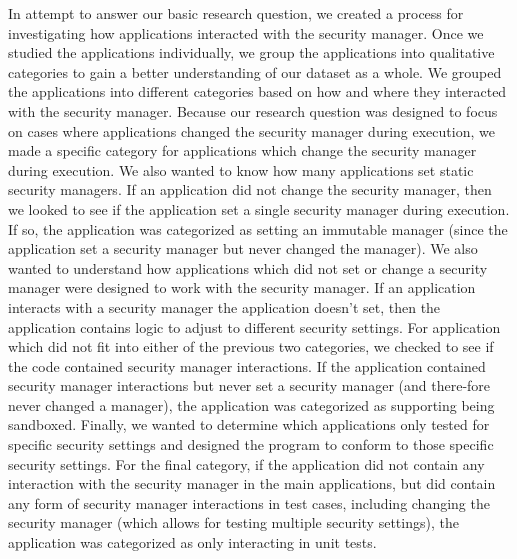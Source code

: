 \documentclass{sig-alternate}
\begin{document}
In attempt to answer our basic research question, we created a process 
for investigating how applications interacted with the security manager.  
Once we studied the applications individually, we group the applications
into qualitative categories to gain a better understanding of our dataset
as a whole.  We grouped the applications into 
different categories based on how and where they interacted with the security 
manager. Because our research question was designed to focus on cases 
where applications changed the security manager during execution, we made a 
specific category for applications which change the security manager during
execution.  We also wanted to know how many applications set static 
security managers. If an application did not change the security manager, 
then we looked to see if the application set a single security manager 
during execution.  If so, the
application was categorized as setting an immutable manager (since the 
application set a security manager but never changed the manager).  We also 
wanted to understand how applications which did not set or change a 
security manager were designed to work with the security manager.  If an
application interacts with a security manager the application doesn't set, 
then the application contains logic to adjust to different security settings.
For application which did not fit into either of the previous two categories, 
we checked to see if the code contained security manager interactions.  If the 
application contained security manager interactions but never set a security 
manager (and there-fore never changed a manager), the application was 
categorized as supporting being sandboxed.  Finally, we wanted to determine
which applications only tested for specific security settings and designed
the program to conform to those specific security settings. 
For the final category, if the
application did not contain any interaction with the security manager in 
the main applications, but did contain any form of security manager 
interactions in test cases, including changing the security manager (which 
allows for testing multiple security settings), the 
application was categorized as only interacting in unit tests.  
\end{document}
